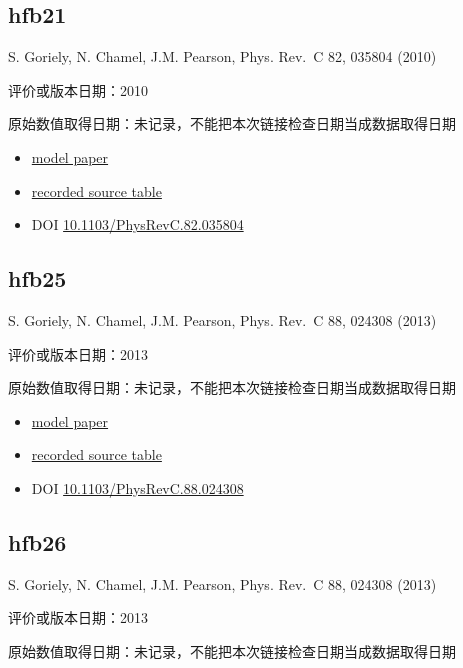 \documentclass[
  11pt,
  letterpaper,
]{article}
\providecommand{\tightlist}{%
  \setlength{\itemsep}{0pt}\setlength{\parskip}{0pt}}
\begin{document}
\subsection{hfb21}\label{hfb21}

S. Goriely, N. Chamel, J.M. Pearson, Phys. Rev.~C 82, 035804 (2010)

评价或版本日期：2010

原始数值取得日期：未记录，不能把本次链接检查日期当成数据取得日期

\begin{itemize}
\tightlist
\item
  \href{https://doi.org/10.1103/PhysRevC.82.035804}{model paper}
\item
  \href{https://www.astro.ulb.ac.be/bruslib/nucdata/hfb21-dat}{recorded
  source table}
\item
  DOI
  \href{https://doi.org/10.1103/PhysRevC.82.035804}{10.1103/PhysRevC.82.035804}
\end{itemize}

\subsection{hfb25}\label{hfb25}

S. Goriely, N. Chamel, J.M. Pearson, Phys. Rev.~C 88, 024308 (2013)

评价或版本日期：2013

原始数值取得日期：未记录，不能把本次链接检查日期当成数据取得日期

\begin{itemize}
\tightlist
\item
  \href{https://doi.org/10.1103/PhysRevC.88.024308}{model paper}
\item
  \href{https://www.astro.ulb.ac.be/bruslib/nucdata/hfb25-dat}{recorded
  source table}
\item
  DOI
  \href{https://doi.org/10.1103/PhysRevC.88.024308}{10.1103/PhysRevC.88.024308}
\end{itemize}

\subsection{hfb26}\label{hfb26}

S. Goriely, N. Chamel, J.M. Pearson, Phys. Rev.~C 88, 024308 (2013)

评价或版本日期：2013

原始数值取得日期：未记录，不能把本次链接检查日期当成数据取得日期
\end{document}
